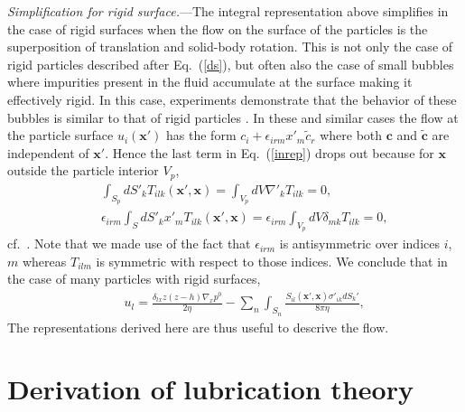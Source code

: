 
{\it Simplification for rigid surface.}---The integral representation above simplifies in the case of rigid surfaces when the flow on the surface of the particles is the superposition of translation and solid-body rotation. This is not only the case of rigid particles described after Eq.~(\ref{ds}), but  often also the case of small bubbles where impurities present in the fluid accumulate at the surface making it effectively rigid. In this case, experiments demonstrate that the behavior of these bubbles is similar to that of rigid particles \cite{hb,levich}. In these and similar cases the flow at the particle surface $u_i(\bm x')$ has the form  $c_i+\epsilon_{irm}x'_m{\tilde c}_r$ where both $\bm c$ and $\bm {\tilde c}$ are independent of $\bm x'$. Hence the last term in Eq.~(\ref{inrep}) drops out because  for $\bm x$ outside the particle interior $V_p$,
\begin{eqnarray}&&
\int_{S_p}dS'_k T_{ilk}(\bm x', \bm x)=\int_{V_p} dV \nabla'_k T_{ilk}=0, \\&& \epsilon_{irm}\int_{S}dS'_k x'_mT_{ilk}(\bm x', \bm x)
=\epsilon_{irm}\int_{V_p} dV \delta_{mk}T_{ilk}=0,
\nonumber
\end{eqnarray}
cf.\ \cite{ps}. Note that we made use of the fact that $\epsilon_{irm}$ is antisymmetric over indices $i$, $m$ whereas $T_{ilm}$ is symmetric with respect to those indices. We conclude that in the case of many particles with rigid surfaces,
\begin{eqnarray}&&\!\!\!\!\!\!\!\!\!\!\!\!\!\!\!\!
u_l\!=\!\frac{\delta_{lx}z(z\!-\!h)\nabla_x p^0}{2\eta}\!-\!\sum_n\int_{S_n}\!\!\!\frac{S_{il}(\bm x', \bm x)\sigma'_{ik}dS_k'}{8\pi \eta},\label{inrepmany}
\end{eqnarray}
The representations derived here are thus useful to descrive  the  flow.

\section{Derivation of lubrication theory}


